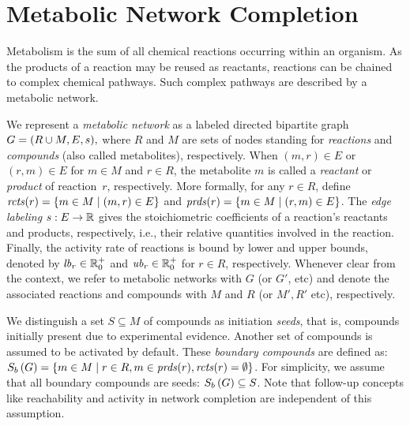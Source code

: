 
\section{Metabolic Network Completion}\label{sec:problem}

Metabolism is the sum of all chemical reactions occurring within an organism.
As the products of a reaction may be reused as reactants, reactions can be chained to complex chemical pathways.
Such complex pathways are described by a metabolic network.

We represent a \emph{metabolic network} as a labeled directed bipartite graph
\(
G=(R\cup M,E,s),
\)
where $R$ and $M$ are sets of nodes standing for \emph{reactions} and \emph{compounds} (also called metabolites), respectively.
%
When $(m,r)\in E$ or $(r,m)\in E$ for $m\in M$ and $r\in R$, the metabolite $m$ is called a \emph{reactant} or \emph{product} of reaction~$r$, respectively. 
%
More formally, for any $r\in R$, define
\(
\mathit{rcts}(r)=\{m\in M\mid (m,r)\in E\}
\)
and
\(
\mathit{prds}(r) =\{m\in M\mid (r,m)\in E\}
\).
%
%
The \emph{edge labeling}
\(
s: E\rightarrow \mathbb{R}
\)
gives the stoichiometric coefficients of a reaction's reactants and products, respectively, i.e., their relative quantities involved in the reaction.
%
Finally, the activity rate of reactions is bound by lower and upper bounds,
denoted by $\mathit{lb}_r\in\mathbb{R}^+_0$ and $\mathit{ub}_r\in\mathbb{R}^+_0$ for $r\in R$, respectively.
%
Whenever clear from the context,
we refer to metabolic networks with $G$ (or $G'$, etc) and denote the associated reactions and compounds with
$M$ and $R$ (or $M',R'$ etc), respectively.

We distinguish a set $S \subseteq M$ of compounds as initiation \emph{seeds}, that is,
compounds initially present due to experimental evidence.
%
Another set of compounds is assumed to be activated by default.
These \emph{boundary compounds} are defined as:
\(
S_{b}\,(G) = \{ m\in M \mid r\in R,  m\in \mathit{prds}(r), \mathit{rcts}(r)=\emptyset \}
\).
%
For simplicity, we assume that all boundary compounds are seeds: $S_{b}\,(G)\subseteq S$.
Note that follow-up concepts like reachability and activity in network completion are independent of this assumption.

